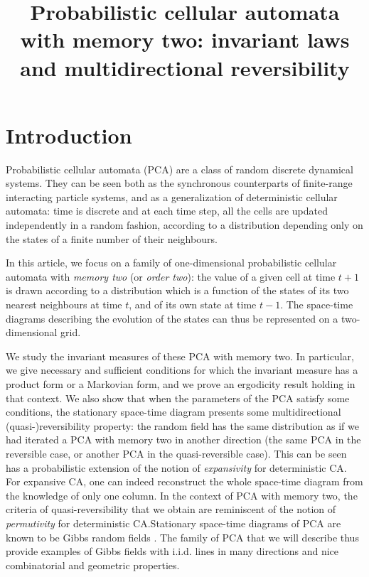 \documentclass[AHL,Unicode,longabstracts]{cedram}
\title[Probabilistic cellular automata with memory two]{Probabilistic cellular automata with memory two: invariant laws and multidirectional reversibility}
\author{\firstname{Jérôme} \lastname{Casse}}
\author{\firstname{Irène} \lastname{Marcovici}}
\newcounter{a}
\begin{document}
\maketitle

\section{Introduction}

Probabilistic cellular automata (PCA) are a class of random discrete dynamical systems. They can be seen both as the synchronous counterparts of finite-range interacting particle systems, and as a generalization of deterministic cellular automata: time is discrete and at each time step, all the cells are updated independently in a random fashion, according to a distribution depending only on the states of a finite number of their neighbours.

In this article, we focus on a family of one-dimensional probabilistic cellular automata with \emph{memory two} (or \emph{order two}): the value of a given cell at time $t+1$ is drawn according to a distribution which is a function of the states of its two nearest neighbours at time $t$, and of its own state at time $t-1$. The space-time diagrams describing the evolution of the states can thus be represented on a two-dimensional grid.

We study the invariant measures of these PCA with memory two. In particular, we give necessary and sufficient conditions for which the invariant measure has a product form or a Markovian form, and we prove an ergodicity result holding in that context. We also show that when the parameters of the PCA satisfy some conditions, the stationary space-time diagram presents some multidirectional (quasi-)reversibility property: the random field has the same distribution as if we had iterated a PCA with memory two in another direction (the same PCA in the reversible case, or another PCA in the quasi-reversible case). This can be seen has a probabilistic extension of the notion of \emph{expansivity} for deterministic CA. For expansive CA, one can indeed reconstruct the whole space-time diagram from the knowledge of only one column. In the context of PCA with memory two, the criteria of quasi-reversibility that we obtain are reminiscent of the notion of \emph{permutivity} for deterministic CA.\linebreak Stationary space-time diagrams of PCA are known to be Gibbs random fields \cite{GKLM,LMS}. The family of PCA that we will describe thus provide examples of Gibbs fields with i.i.d. lines in many directions and nice combinatorial and geometric properties.
\end{document}
